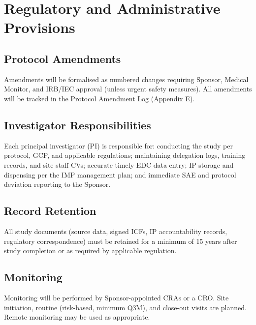 \section{Regulatory and Administrative Provisions}
\label{sec:regulatory}

\subsection{Protocol Amendments}

Amendments will be formalised as numbered changes requiring Sponsor, Medical Monitor, and IRB/IEC approval (unless urgent safety measures). All amendments will be tracked in the Protocol Amendment Log (Appendix E).

\subsection{Investigator Responsibilities}

Each principal investigator (PI) is responsible for: conducting the study per protocol, GCP, and applicable regulations; maintaining delegation logs, training records, and site staff CVs; accurate timely EDC data entry; IP storage and dispensing per the IMP management plan; and immediate SAE and protocol deviation reporting to the Sponsor.

\subsection{Record Retention}

All study documents (source data, signed ICFs, IP accountability records, regulatory correspondence) must be retained for a minimum of 15 years after study completion or as required by applicable regulation.

\subsection{Monitoring}

Monitoring will be performed by Sponsor-appointed CRAs or a CRO. Site initiation, routine (risk-based, minimum Q3M), and close-out visits are planned. Remote monitoring may be used as appropriate.

